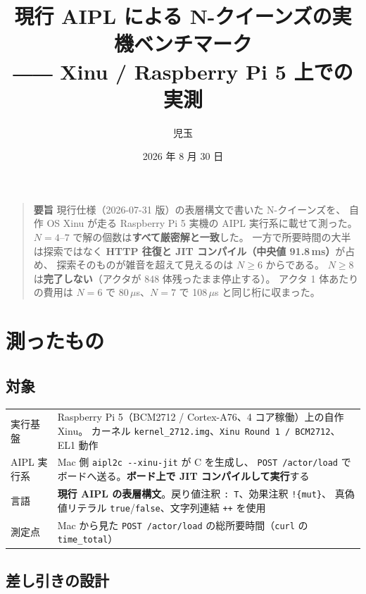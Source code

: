 \documentclass[11pt,a4paper]{ltjsarticle}
\title{\textbf{現行 AIPL による N-クイーンズの実機ベンチマーク}\\[5pt]
\large ―― Xinu / Raspberry Pi 5 上での実測}
\author{児玉}
\date{2026 年 8 月 30 日}
\newcommand{\code}[1]{\texttt{\small #1}}
\begin{document}
\maketitle

\begin{quote}\small
\textbf{要旨}\quad
現行仕様（2026-07-31 版）の表層構文で書いた N-クイーンズを、
自作 OS Xinu が走る Raspberry Pi 5 実機の AIPL 実行系に載せて測った。
$N=4$--$7$ で解の個数は\textbf{すべて厳密解と一致}した。
一方で所要時間の大半は探索ではなく \textbf{HTTP 往復と JIT コンパイル（中央値 91.8\,ms）}が占め、
探索そのものが雑音を超えて見えるのは $N \ge 6$ からである。
$N \ge 8$ は\textbf{完了しない}（アクタが 848 体残ったまま停止する）。
アクタ 1 体あたりの費用は $N=6$ で 80\,$\mu$s、$N=7$ で 108\,$\mu$s と同じ桁に収まった。
\end{quote}

\section{測ったもの}

\subsection{対象}

\begin{center}\small
\begin{tabular}{@{}p{30mm}p{112mm}@{}}
\toprule
実行基盤 & Raspberry Pi 5（BCM2712 / Cortex-A76、4 コア稼働）上の自作 Xinu。
カーネル \code{kernel\_2712.img}、\code{Xinu Round 1 / BCM2712}、EL1 動作 \\
\addlinespace
AIPL 実行系 & Mac 側 \code{aipl2c -{}-xinu-jit} が C を生成し、
\code{POST /actor/load} でボードへ送る。\textbf{ボード上で JIT コンパイルして実行}する \\
\addlinespace
言語 & \textbf{現行 AIPL の表層構文}。戻り値注釈 \code{: T}、効果注釈 \code{!\{mut\}}、
真偽値リテラル \code{true}/\code{false}、文字列連結 \code{++} を使用 \\
\addlinespace
測定点 & Mac から見た \code{POST /actor/load} の総所要時間（\code{curl} の \code{time\_total}） \\
\bottomrule
\end{tabular}
\end{center}

\subsection{差し引きの設計}
\end{document}
